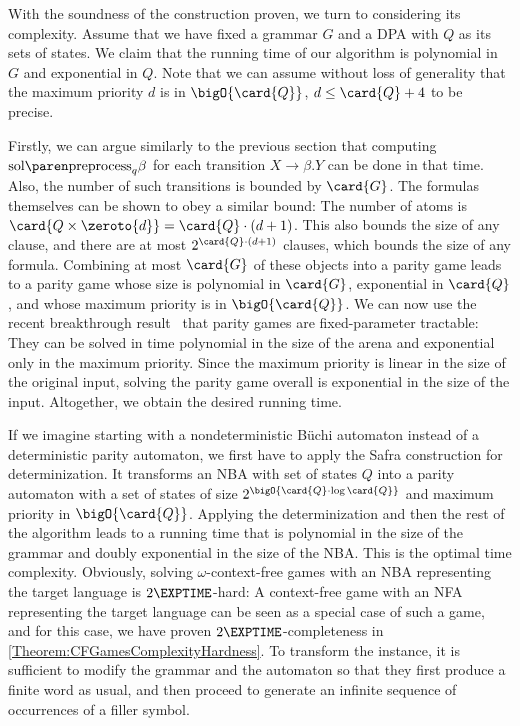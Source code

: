\documentclass[../../diss.tex]{subfiles}
\begin{document}
With the soundness of the construction proven, we turn to considering its complexity.
Assume that we have fixed a grammar $G$ and a DPA with $Q$ as its sets of states.
We claim that the running time of our algorithm is polynomial in $G$ and exponential in $Q$.
Note that we can assume without loss of generality that the maximum priority $d$ is in $\bigO{\card{Q}}$, $d \leq \card{Q} + 4$ to be precise.

Firstly, we can argue similarly to the previous section that computing $\sol{\text{preprocess}_q{\beta}}$ for each transition $X \to \beta.Y$ can be done in that time.
Also, the number of such transitions is bounded by $\card{G}$.
The formulas themselves can be shown to obey a similar bound:
The number of atoms is $\card{ Q \times \zeroto{d}} = \card{Q} \cdot (d+1)$.
This also bounds the size of any clause, and there are at most $2^{\card{Q} \cdot (d+1)}$ clauses, which bounds the size of any formula.
Combining at most $\card{G}$ of these objects into a parity game leads to a parity game whose size is polynomial in $\card{G}$, exponential in $\card{Q}$, and whose maximum priority is in $\bigO{\card{Q}}$.
We can now use the recent breakthrough result~\cite{CaludeJKLS17} that parity games are fixed-parameter tractable:
They can be solved in time polynomial in the size of the arena and exponential only in the maximum priority.
Since the maximum priority is linear in the size of the original input, solving the parity game overall is exponential in the size of the input.
Altogether, we obtain the desired running time.

If we imagine starting with a nondeterministic Büchi automaton instead of a deterministic parity automaton, we first have to apply the Safra construction for determinization.
It transforms an NBA with set of states $Q$ into a parity automaton with a set of states of size $2^{\bigO{ \card{Q} \cdot \log \card{Q}}}$ and maximum priority in $\bigO{\card{Q}}$.
Applying the determinization and then the rest of the algorithm leads to a running time that is polynomial in the size of the grammar and doubly exponential in the size of the NBA.\@
This is the optimal time complexity.
Obviously, solving $\omega$-context-free games with an NBA representing the target language is $2\EXPTIME$-hard:
A context-free game with an NFA representing the target language can be seen as a special case of such a game, and for this case, we have proven $2\EXPTIME$-completeness in \cref{Theorem:CFGamesComplexityHardness}.
To transform the instance, it is sufficient to modify the grammar and the automaton so that they first produce a finite word as usual, and then proceed to generate an infinite sequence of occurrences of a filler symbol.
\end{document}

